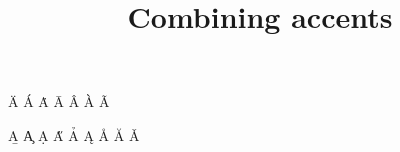 \documentclass{amsart}
\title{Combining accents}
\begin{document}
\maketitle

\"A
\'A
\.A
\=A
\^A
\`A
\~A

\b{A}
\c{A}
\d{A}
\H{A}
\h{A}
\k{A}
\r{A}
\u{A}
\v{A}


\end{document}
